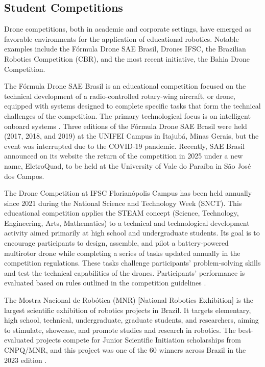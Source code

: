 \documentclass[conference]{IEEEtran}
\begin{document}
\subsection{Student Competitions}

Drone competitions, both in academic and corporate settings, have emerged as favorable environments for the application of educational robotics. Notable examples include the Fórmula Drone SAE Brasil, Drones IFSC, the Brazilian Robotics Competition (CBR), and the most recent initiative, the Bahia Drone Competition.

The Fórmula Drone SAE Brasil is an educational competition focused on the technical development of a radio-controlled rotary-wing aircraft, or drone, equipped with systems designed to complete specific tasks that form the technical challenges of the competition. The primary technological focus is on intelligent onboard systems \cite{b7}. Three editions of the Fórmula Drone SAE Brasil were held (2017, 2018, and 2019) at the UNIFEI Campus in Itajubá, Minas Gerais, but the event was interrupted due to the COVID-19 pandemic. Recently, SAE Brasil announced on its website the return of the competition in 2025 under a new name, EletroQuad, to be held at the University of Vale do Paraíba in São José dos Campos.

The Drone Competition at IFSC Florianópolis Campus has been held annually since 2021 during the National Science and Technology Week (SNCT). This educational competition applies the STEAM concept (Science, Technology, Engineering, Arts, Mathematics) to a technical and technological development activity aimed primarily at high school and undergraduate students. Its goal is to encourage participants to design, assemble, and pilot a battery-powered multirotor drone while completing a series of tasks updated annually in the competition regulations. These tasks challenge participants' problem-solving skills and test the technical capabilities of the drones. Participants' performance is evaluated based on rules outlined in the competition guidelines \cite{b4}.

The Mostra Nacional de Robótica (MNR) [National Robotics Exhibition] is the largest scientific exhibition of robotics projects in Brazil. It targets elementary, high school, technical, undergraduate, graduate students, and researchers, aiming to stimulate, showcase, and promote studies and research in robotics. The best-evaluated projects compete for Junior Scientific Initiation scholarships from CNPQ/MNR, and this project was one of the 60 winners across Brazil in the 2023 edition \cite{b5}.
\end{document}
